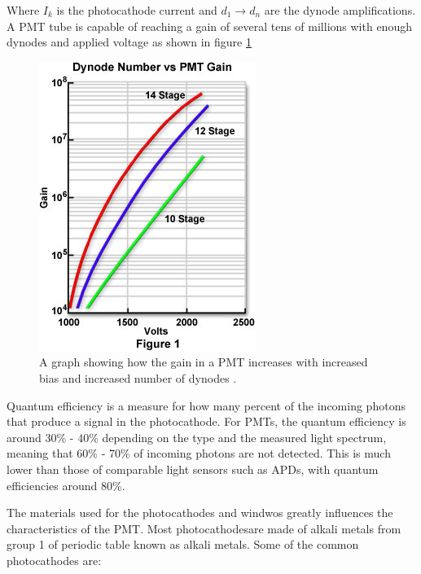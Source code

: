 Where $I_k$ is the photocathode current and $d_1 \rightarrow d_n$ are the dynode amplifications. A PMT tube is capable of reaching a gain of several tens of millions with enough dynodes and applied voltage as shown in figure \ref{fig:dynode_gain}

\begin{figure}[htb]
\begin{center}
\includegraphics[scale=0.6]{figures/RCS/dynodegain}
\caption{A graph showing how the gain in a PMT increases with increased bias and increased number of dynodes \cite{Dynode_gain}.}
\label{fig:dynode_gain}
\end{center}
\end{figure}

Quantum efficiency is a measure for how many percent of the incoming photons that produce a signal in the photocathode. For PMTs, the quantum efficiency is around 30\% - 40\% depending on the type and the measured light spectrum, meaning that 60\% - 70\% of incoming photons are not detected. This is much lower than those of comparable light sensors such as APDs, with quantum efficiencies around 80\%.

The materials used for the photocathodes and windwos greatly influences the characteristics of the PMT. Most photocathodesare made of alkali metals from group 1 of periodic table known as alkali metals. Some of the common photocathodes are:

